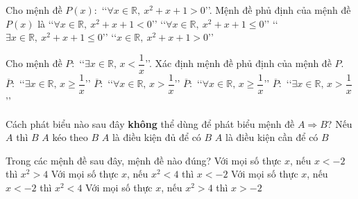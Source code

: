 \begin{ex}%
	Cho mệnh đề $P(x)\colon$ \lq\lq$\forall x\in \mathbb{R},\ x^2+x+1>0$\rq\rq. Mệnh đề phủ định của mệnh đề $P(x)$ là
	\choice
	{\lq\lq$\forall x\in \mathbb{R},\ x^2+x+1<0$\rq\rq}
	{\lq\lq$\forall x\in \mathbb{R},\ x^2+x+1\leqslant 0$\rq\rq}
	{\True \lq\lq$\exists x\in \mathbb{R},\ x^2+x+1\leqslant 0$\rq\rq}
	{\lq\lq$x\in \mathbb{R},\ x^2+x+1>0$\rq\rq}
\end{ex}
\begin{ex}%
	Cho mệnh đề $P\colon$ \lq\lq$\exists x\in \mathbb{R},\, x<\dfrac{1}{x}$\rq\rq. Xác định mệnh đề phủ định của mệnh đề $P$.
	\choice
	{$\overline{P}\colon$ \lq\lq $\exists x\in \mathbb{R},\, x\ge \dfrac{1}{x}$\rq\rq}
	{$\overline{P}\colon$ \lq\lq $\forall x\in \mathbb{R},\, x> \dfrac{1}{x}$\rq\rq}
	{\True 	$\overline{P}\colon$ \lq\lq $\forall x\in \mathbb{R},\, x\ge \dfrac{1}{x}$\rq\rq}
	{$\overline{P}\colon$ \lq\lq $\exists x\in \mathbb{R},\, x> \dfrac{1}{x}$\rq\rq}
\end{ex}
\begin{ex}%
	Cách phát biểu nào sau đây \textbf{không} thể dùng để phát biểu mệnh đề $A \Rightarrow B$?
	\choice
	{Nếu $A$ thì $B$}
	{$A$ kéo theo $B$}
	{$A$ là điều kiện đủ để có $B$}
	{\True $A$ là điều kiện cần để có $B$}
\end{ex}
\begin{ex}%
	Trong các mệnh đề sau đây, mệnh đề nào đúng?
	\choice
	{\True Với mọi số thực $x$, nếu $x <-2$ thì $x^2> 4$}
	{Với mọi số thực $x$, nếu $x^2< 4$ thì $x <-2$}
	{Với mọi số thực $x$, nếu $x <-2$ thì $x^2< 4$}
	{Với mọi số thực $x$, nếu $x^2> 4$ thì $x >-2$}
\end{ex}
